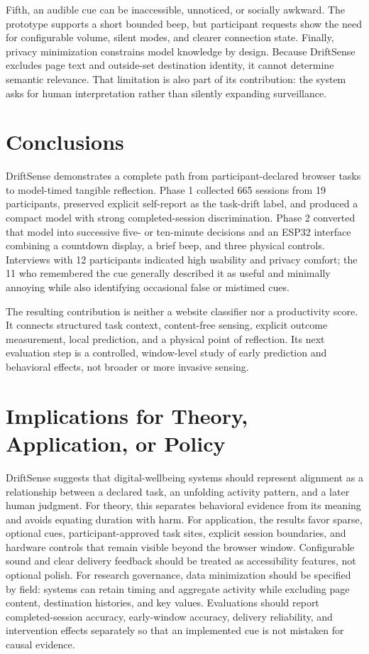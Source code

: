 \documentclass[12pt,a4paper]{article}
\begin{document}
Fifth, an audible cue can be inaccessible, unnoticed, or socially awkward. The prototype supports a short bounded beep, but participant requests show the need for configurable volume, silent modes, and clearer connection state. Finally, privacy minimization constrains model knowledge by design. Because DriftSense excludes page text and outside-set destination identity, it cannot determine semantic relevance. That limitation is also part of its contribution: the system asks for human interpretation rather than silently expanding surveillance.

\section{Conclusions}

DriftSense demonstrates a complete path from participant-declared browser tasks to model-timed tangible reflection. Phase 1 collected 665 sessions from 19 participants, preserved explicit self-report as the task-drift label, and produced a compact model with strong completed-session discrimination. Phase 2 converted that model into successive five- or ten-minute decisions and an ESP32 interface combining a countdown display, a brief beep, and three physical controls. Interviews with 12 participants indicated high usability and privacy comfort; the 11 who remembered the cue generally described it as useful and minimally annoying while also identifying occasional false or mistimed cues.

The resulting contribution is neither a website classifier nor a productivity score. It connects structured task context, content-free sensing, explicit outcome measurement, local prediction, and a physical point of reflection. Its next evaluation step is a controlled, window-level study of early prediction and behavioral effects, not broader or more invasive sensing.

\section{Implications for Theory, Application, or Policy}

DriftSense suggests that digital-wellbeing systems should represent alignment as a relationship between a declared task, an unfolding activity pattern, and a later human judgment. For theory, this separates behavioral evidence from its meaning and avoids equating duration with harm. For application, the results favor sparse, optional cues, participant-approved task sites, explicit session boundaries, and hardware controls that remain visible beyond the browser window. Configurable sound and clear delivery feedback should be treated as accessibility features, not optional polish. For research governance, data minimization should be specified by field: systems can retain timing and aggregate activity while excluding page content, destination histories, and key values. Evaluations should report completed-session accuracy, early-window accuracy, delivery reliability, and intervention effects separately so that an implemented cue is not mistaken for causal evidence.
\end{document}
